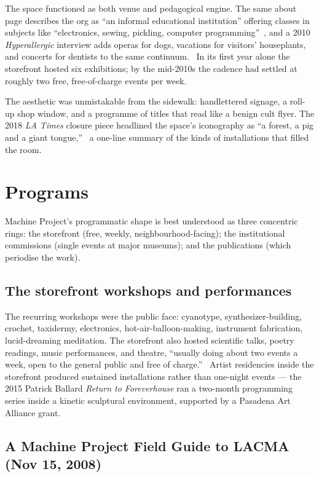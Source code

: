 \documentclass[10pt,letterpaper,twocolumn]{article}
\begin{document}
The space functioned as both venue and pedagogical engine. The same about page describes the org as ``an informal educational institution'' offering classes in subjects like ``electronics, sewing, pickling, computer programming''~\citep{machinearchivalabout}, and a 2010 \emph{Hyperallergic} interview adds operas for dogs, vacations for visitors' houseplants, and concerts for dentists to the same continuum.~\citep{tangbook} In its first year alone the storefront hosted six exhibitions; by the mid-2010s the cadence had settled at roughly two free, free-of-charge events per week.~\citep{wikipediamachine,heavymanners}

The aesthetic was unmistakable from the sidewalk: handlettered signage, a roll-up shop window, and a programme of titles that read like a benign cult flyer. The 2018 \emph{LA Times} closure piece headlined the space's iconography as ``a forest, a pig and a giant tongue,''~\citep{ltimesclosure} a one-line summary of the kinds of installations that filled the room.

\section{Programs}

Machine Project's programmatic shape is best understood as three concentric rings: the storefront (free, weekly, neighbourhood-facing); the institutional commissions (single events at major museums); and the publications (which periodise the work).

\subsection{The storefront workshops and performances}

The recurring workshops were the public face: cyanotype, synthesizer-building, crochet, taxidermy, electronics, hot-air-balloon-making, instrument fabrication, lucid-dreaming meditation. The storefront also hosted scientific talks, poetry readings, music performances, and theatre, ``usually doing about two events a week, open to the general public and free of charge.''~\citep{heavymanners} Artist residencies inside the storefront produced sustained installations rather than one-night events --- the 2015 Patrick Ballard \emph{Return to Foreverhouse} ran a two-month programming series inside a kinetic sculptural environment, supported by a Pasadena Art Alliance grant.~\citep{paamachine}

\subsection{A Machine Project Field Guide to LACMA (Nov 15, 2008)}
\end{document}
